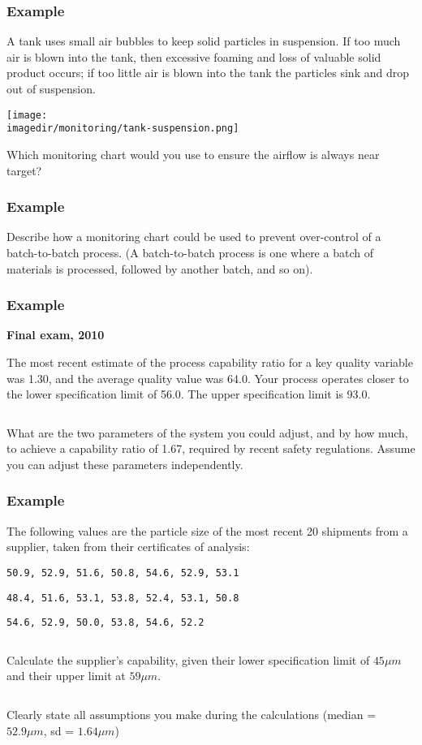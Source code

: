 \begin{frame}\frametitle{Example}

	A tank uses small air bubbles to keep solid particles in suspension. If too much air is blown into the tank, then excessive foaming and loss of valuable solid product occurs; if too little air is blown into the tank the particles sink and drop out of suspension.
	
	\begin{center}
		\texttt{[image: \\imagedir/monitoring/tank-suspension.png]}
	\end{center}

	Which monitoring chart would you use to ensure the airflow is always near target?
\end{frame}

\begin{frame}\frametitle{Example}

	Describe how a monitoring chart could be used to prevent over-control of a batch-to-batch process. (A batch-to-batch process is one where a batch of materials is processed, followed by another batch, and so on).
\end{frame}

\begin{frame}\frametitle{Example}

	\textbf{Final exam, 2010}

	The most recent estimate of the process capability ratio for a key quality variable was 1.30, and the average quality value was 64.0. Your process operates closer to the lower specification limit of 56.0. The upper specification limit is 93.0.

	$\quad$

	What are the two parameters of the system you could adjust, and by how much, to achieve a capability ratio of 1.67, required by recent safety regulations. Assume you can adjust these parameters independently.
\end{frame}

\begin{frame}\frametitle{Example}

	The following values are the particle size of the most recent 20 shipments from a supplier, taken from their certificates of analysis:

	\texttt{50.9, 52.9, 51.6, 50.8, 54.6, 52.9, 53.1 }

	\texttt{48.4, 51.6, 53.1, 53.8, 52.4, 53.1, 50.8}

	\texttt{54.6, 52.9, 50.0, 53.8, 54.6, 52.2}

	$\qquad$

	Calculate the supplier's capability, given their lower specification limit of $45 \mu m$ and their upper limit at $59 \mu m$.

	$\qquad$

	Clearly state all assumptions you make during the calculations (median = $52.9 \mu m$, sd = $1.64 \mu m$)
\end{frame}

